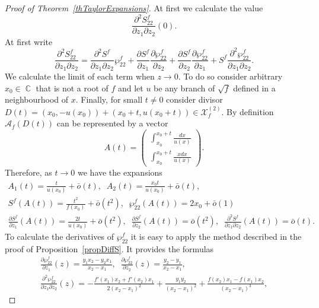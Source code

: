 \documentclass{amsart}
\numberwithin{equation}{section}
\theoremstyle{definition}
\theoremstyle{remark}
\DeclareMathOperator{\CC}{\mathbb C}
\begin{document}
	\begin{proof}[Proof of Theorem~\ref{thTaylorExpansions}]
		At first we calculate the value 
		\[
		\frac{\partial^2 S_{22}^f}{\partial z_1 \partial z_2}(0).
		\]
		At first write
		\begin{equation}\label{eqSecDer}
			\frac{\partial^2 S_{22}^f}{\partial z_1 \partial z_2} = \frac{\partial^2 S^f}{\partial z_1 \partial z_2}\wp_{22}^f + \frac{\partial S^f}{\partial z_1}\frac{\partial \wp_{22}^f}{\partial z_2} + \frac{\partial S^f}{\partial z_2}\frac{\partial \wp_{22}^f}{\partial z_1} + S^f\frac{\partial^2 \wp_{22}^f}{\partial z_1 \partial z_2}.
		\end{equation}
		We calculate the limit of each term when $z \to 0$. To do so
		consider arbitrary $x_0 \in \CC$ that is not a root of $f$ and let $u$ be any branch of $\sqrt{f}$ defined in a neighbourhood of $x$. Finally, for small $t \ne 0$ consider divisor $D(t) = (x_0, -u(x_0)) + (x_0 + t, u(x_0 + t)) \in \mathcal X_f^{(2)}$. By definition $\mathscr A_f(D(t))$ can be represented by a vector
		\[
		A(t) = \begin{pmatrix}
			\displaystyle\int_{x_0}^{x_0+t} \frac{dx}{u(x)} \\
			\displaystyle\int_{x_0}^{x_0+t} \frac{xdx}{u(x)}
		\end{pmatrix}.
		\]
		Therefore, as $t \to 0$ we have the expansions
		\[
		\begin{gathered}
			A_1(t) = \frac{t}{u(x_0)} + \bar{o}(t),\;\; A_2(t) = \frac{x_0 t}{u(x_0)} + \bar{o}(t),\\S^f(A(t)) = \frac{t^2}{f(x_0)} + \bar{o}(t^2),\;\;\wp_{22}^f(A(t)) = 2x_0 + \bar{o}(1)\\\frac{\partial S^f}{\partial z_1}(A(t)) = \frac{2t}{u(x_0)} + \bar{o}(t^2),\;\;\frac{\partial S^f}{\partial z_2}(A(t)) = \bar{o}(t^2),\;\;\frac{\partial^2 S^f}{\partial z_1\partial z_2}(A(t)) = \bar{o}(t).
		\end{gathered}
		\]
		To calculate the derivatives of $\wp_{22}^f$ it is easy to apply the method described in the proof of Proposition~\ref{propDiffS}. It provides the formulas
		\[
		\begin{gathered}
			\frac{\partial \wp_{22}^f}{\partial z_1}(z) = \frac{y_1x_2 - y_2x_1}{x_2 - x_1},\;\;\frac{\partial \wp_{22}^f}{\partial z_2}(z) = \frac{y_2 - y_1}{x_2 - x_1},\\
			\frac{\partial^2 \wp_{22}^f}{\partial z_1 \partial z_2}(z) = -\frac{f'(x_1)x_2 + f'(x_2)x_1}{2(x_2 - x_1)^2} + \frac{y_1y_2}{(x_2 - x_1)^2} + \frac{f(x_2)x_1 - f(x_1)x_2}{(x_2 - x_1)^3},

\end{gathered}\]
\end{proof}
\end{document}

